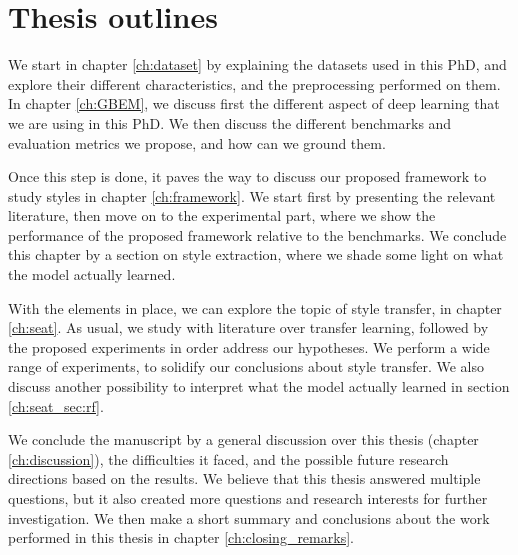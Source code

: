 %
%

\section{Thesis outlines}
\par We start in chapter \ref{ch:dataset} by explaining the datasets used in this PhD, and explore their different characteristics, and the preprocessing performed on them. In chapter \ref{ch:GBEM}, we discuss first the different aspect of deep learning that we are using in this PhD. We then discuss the different benchmarks and evaluation metrics we propose, and how can we ground them.

\par Once this step is done, it paves the way to discuss our proposed framework to study styles in chapter \ref{ch:framework}. We start first by presenting the relevant literature, then move on to the experimental part, where we show the performance of the proposed framework relative to the benchmarks. We conclude this chapter by a section on style extraction, where we shade some light on what the model actually learned.

\par With the elements in place, we can explore the topic of style transfer, in chapter \ref{ch:seat}. As usual, we study with literature over transfer learning, followed by the proposed experiments in order address our hypotheses. We perform a wide range of experiments, to solidify our conclusions about style transfer. We also discuss another possibility to interpret what the model actually learned in section \ref{ch:seat_sec:rf}.

\par We conclude the manuscript by a general discussion over this thesis (chapter \ref{ch:discussion}), the difficulties it faced, and the possible future research directions based on the results. We believe that this thesis answered multiple questions, but it also created more questions and research interests for further investigation. We then make a short summary and conclusions about the work performed in this thesis in chapter \ref{ch:closing_remarks}.
